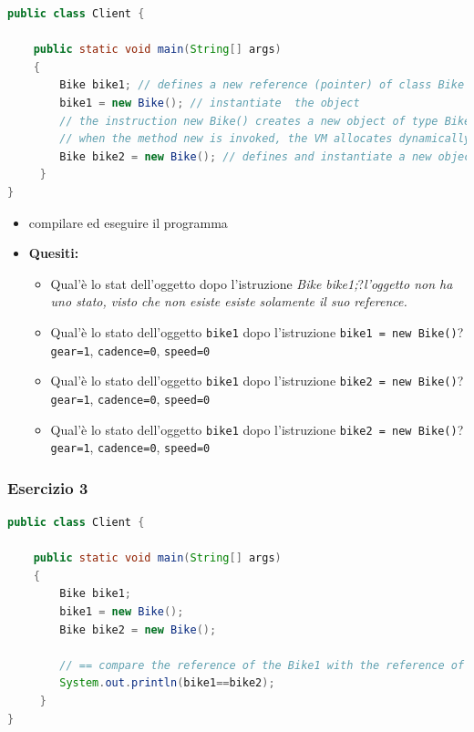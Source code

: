 \documentclass{article}
\theoremstyle{definition}
\begin{document}
\begin{lstlisting}[language=Java,escapechar=|]
public class Client {
	
	public static void main(String[] args)
    {
        Bike bike1; // defines a new reference (pointer) of class Bike with a predefined value null
        bike1 = new Bike(); // instantiate  the object
        // the instruction new Bike() creates a new object of type Bike and returns the reference to this object which is assigned to the reference bike1
        // when the method new is invoked, the VM allocates dynamically the quantity of memory which is sufficient to contain the Bike object
        Bike bike2 = new Bike(); // defines and instantiate a new object of class Bike
     }
}
\end{lstlisting}
\begin{itemize}
\item compilare ed eseguire il programma
\end{itemize}

\begin{itemize}
\item 
\textbf{Quesiti:}\\
\begin{itemize}
\item Qual'\`e lo stat dell'oggetto dopo l'istruzione \emph{Bike bike1;}?\emph{l'oggetto non ha uno stato, visto che non esiste esiste solamente il suo reference.}
\item Qual'\`e lo stato dell'oggetto  \texttt{bike1} dopo l'istruzione  \texttt{bike1 = new Bike()}? \texttt{gear=1}, \texttt{cadence=0}, \texttt{speed=0}
\item Qual'\`e lo stato dell'oggetto  \texttt{bike1} dopo l'istruzione \texttt{bike2 = new Bike()}? \texttt{gear=1}, \texttt{cadence=0}, \texttt{speed=0}
\item Qual'\`e lo stato dell'oggetto  \texttt{bike1} dopo l'istruzione \texttt{bike2 = new Bike()}? \texttt{gear=1}, \texttt{cadence=0}, \texttt{speed=0}
\end{itemize}
\end{itemize}



\subsubsection{Esercizio 3}
\begin{lstlisting}[language=Java,escapechar=|]
public class Client {
	
	public static void main(String[] args)
    {
        Bike bike1; 
        bike1 = new Bike();
        Bike bike2 = new Bike(); 
        
        // == compare the reference of the Bike1 with the reference of the Bike2
        System.out.println(bike1==bike2);
     }
}
\end{lstlisting}
\end{document}
